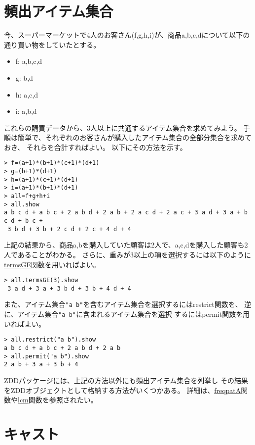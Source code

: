 \section{頻出アイテム集合}
今、スーパーマーケットで4人のお客さん(f,g,h,i)が、商品a,b,c,dについて以下の通り買い物をしていたとする。
\begin{itemize}
\item f: a,b,c,d
\item g: b,d
\item h: a,c,d
\item i: a,b,d
\end{itemize}
これらの購買データから、3人以上に共通するアイテム集合を求めてみよう。
手順は簡単で、それぞれのお客さんが購入したアイテム集合の全部分集合を求めておき、
それらを合計すればよい。
以下にその方法を示す。

\begin{Verbatim}[baselinestretch=0.7,frame=single]
> f=(a+1)*(b+1)*(c+1)*(d+1)
> g=(b+1)*(d+1)
> h=(a+1)*(c+1)*(d+1)
> i=(a+1)*(b+1)*(d+1)
> all=f+g+h+i
> all.show
a b c d + a b c + 2 a b d + 2 a b + 2 a c d + 2 a c + 3 a d + 3 a + b c d + b c +
 3 b d + 3 b + 2 c d + 2 c + 4 d + 4  
\end{Verbatim}

上記の結果から、商品a,bを購入していた顧客は2人で、a,c,dを購入した顧客も2人であることがわかる。
さらに、重みが3以上の項を選択するには以下のように
\hyperref[sect:termsGE]{termsGE}関数を用いればよい。

\begin{Verbatim}[baselinestretch=0.7,frame=single]
> all.termsGE(3).show
 3 a d + 3 a + 3 b d + 3 b + 4 d + 4
\end{Verbatim}

また、アイテム集合\verb|"a b"|を含むアイテム集合を選択するにはrestrict関数を、
逆に、アイテム集合\verb|"a b"|に含まれるアイテム集合を選択
するにはpermit関数を用いればよい。

\begin{Verbatim}[baselinestretch=0.7,frame=single]
> all.restrict("a b").show
a b c d + a b c + 2 a b d + 2 a b 
> all.permit("a b").show
2 a b + 3 a + 3 b + 4  
\end{Verbatim}

ZDDパッケージには、上記の方法以外にも頻出アイテム集合を列挙し
その結果をZDDオブジェクトとして格納する方法がいくつかある。
詳細は、\hyperref[sect:freqpatA]{freqpatA}関数や\hyperref[sect:lcm]{lcm}関数を参照されたい。



\section{キャスト}

